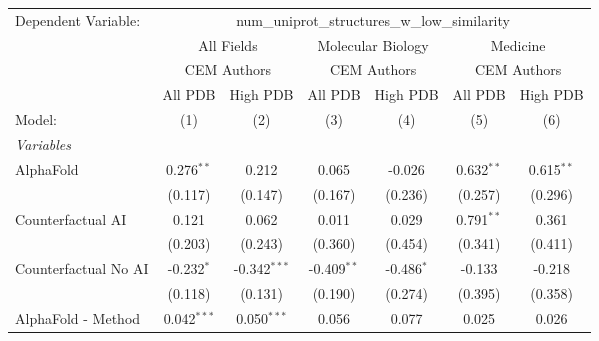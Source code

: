 \begingroup
\centering
\begin{tabular}{lcccccc}
   \tabularnewline \midrule \midrule
   Dependent Variable: & \multicolumn{6}{c}{num\_uniprot\_structures\_w\_low\_similarity}\\
 & \multicolumn{2}{c}{All Fields} & \multicolumn{2}{c}{Molecular Biology} & \multicolumn{2}{c}{Medicine} \\
\cmidrule(lr){2-3} \cmidrule(lr){4-5} \cmidrule(lr){6-7}
 & \multicolumn{2}{c}{CEM Authors} & \multicolumn{2}{c}{CEM Authors} & \multicolumn{2}{c}{CEM Authors} \\
\cmidrule(lr){2-3} \cmidrule(lr){4-5} \cmidrule(lr){6-7}
 & \multicolumn{1}{c}{All PDB} & \multicolumn{1}{c}{High PDB} & \multicolumn{1}{c}{All PDB} & \multicolumn{1}{c}{High PDB} & \multicolumn{1}{c}{All PDB} & \multicolumn{1}{c}{High PDB} \\
\cmidrule(lr){2-2} \cmidrule(lr){3-3} \cmidrule(lr){4-4} \cmidrule(lr){5-5} \cmidrule(lr){6-6} \cmidrule(lr){7-7}
   Model:                                                     & (1)           & (2)            & (3)           & (4)           & (5)           & (6)\\  
   \midrule
   \emph{Variables}\\
   AlphaFold                                                  & 0.276$^{**}$  & 0.212          & 0.065         & -0.026        & 0.632$^{**}$  & 0.615$^{**}$\\   
                                                              & (0.117)       & (0.147)        & (0.167)       & (0.236)       & (0.257)       & (0.296)\\   
   Counterfactual AI                                          & 0.121         & 0.062          & 0.011         & 0.029         & 0.791$^{**}$  & 0.361\\   
                                                              & (0.203)       & (0.243)        & (0.360)       & (0.454)       & (0.341)       & (0.411)\\   
   Counterfactual No AI                                       & -0.232$^{*}$  & -0.342$^{***}$ & -0.409$^{**}$ & -0.486$^{*}$  & -0.133        & -0.218\\   
                                                              & (0.118)       & (0.131)        & (0.190)       & (0.274)       & (0.395)       & (0.358)\\   
   AlphaFold - Method                                         & 0.042$^{***}$ & 0.050$^{***}$  & 0.056         & 0.077         & 0.025         & 0.026\\   

\end{tabular}
